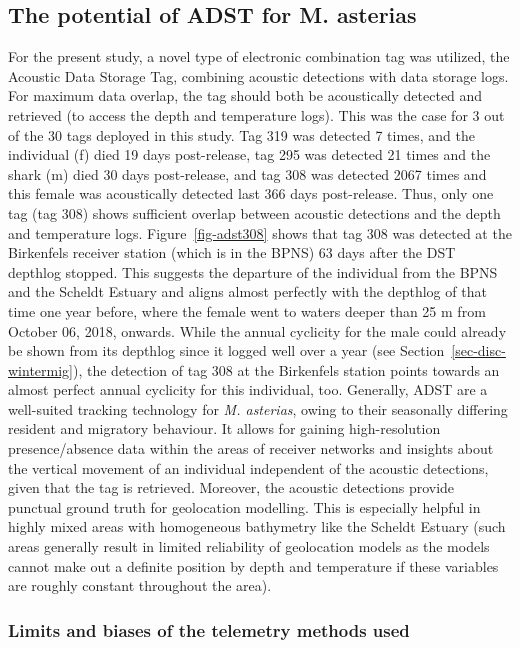 \documentclass[
  authoryear,
  review,
  3p]{elsarticle}
\begin{document}
\hypertarget{the-potential-of-adst-for-m.-asterias}{%
\subsection{The potential of ADST for M.
asterias}\label{the-potential-of-adst-for-m.-asterias}}

For the present study, a novel type of electronic combination tag was
utilized, the Acoustic Data Storage Tag, combining acoustic detections
with data storage logs. For maximum data overlap, the tag should both be
acoustically detected and retrieved (to access the depth and temperature
logs). This was the case for 3 out of the 30 tags deployed in this
study. Tag 319 was detected 7 times, and the individual (f) died 19 days
post-release, tag 295 was detected 21 times and the shark (m) died 30
days post-release, and tag 308 was detected 2067 times and this female
was acoustically detected last 366 days post-release. Thus, only one tag
(tag 308) shows sufficient overlap between acoustic detections and the
depth and temperature logs. Figure~\ref{fig-adst308} shows that tag 308
was detected at the Birkenfels receiver station (which is in the BPNS)
63 days after the DST depthlog stopped. This suggests the departure of
the individual from the BPNS and the Scheldt Estuary and aligns almost
perfectly with the depthlog of that time one year before, where the
female went to waters deeper than 25 m from October 06, 2018, onwards.
While the annual cyclicity for the male could already be shown from its
depthlog since it logged well over a year (see
Section~\ref{sec-disc-wintermig}), the detection of tag 308 at the
Birkenfels station points towards an almost perfect annual cyclicity for
this individual, too. Generally, ADST are a well-suited tracking
technology for \emph{M. asterias}, owing to their seasonally differing
resident and migratory behaviour. It allows for gaining high-resolution
presence/absence data within the areas of receiver networks and insights
about the vertical movement of an individual independent of the acoustic
detections, given that the tag is retrieved. Moreover, the acoustic
detections provide punctual ground truth for geolocation modelling. This
is especially helpful in highly mixed areas with homogeneous bathymetry
like the Scheldt Estuary (such areas generally result in limited
reliability of geolocation models as the models cannot make out a
definite position by depth and temperature if these variables are
roughly constant throughout the area).

\hypertarget{limits-and-biases-of-the-telemetry-methods-used}{%
\subsubsection{Limits and biases of the telemetry methods
used}\label{limits-and-biases-of-the-telemetry-methods-used}}
\end{document}

